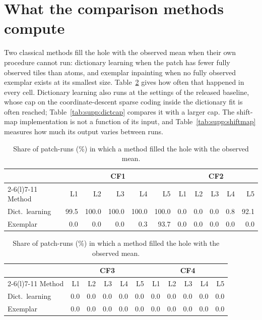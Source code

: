 \documentclass[11pt]{article}
\begin{document}
\section{What the comparison methods compute}
\label{sec:supp:baselines}

Two classical methods fill the hole with the observed mean when their own
procedure cannot run: dictionary learning when the patch has fewer fully observed
tiles than atoms, and exemplar inpainting when no fully observed exemplar exists
at its smallest size. Table~\ref{tab:supp:fallbacks} gives how often that
happened in every cell. Dictionary learning also runs at the settings of the
released baseline, whose cap on the coordinate-descent sparse coding inside the
dictionary fit is often reached; Table~\ref{tab:supp:dictcap} compares it with a
larger cap. The shift-map implementation is not a function of its input, and
Table~\ref{tab:supp:shiftmap} measures how much its output varies between runs.

\begin{table}[htbp]
\centering
\caption{Share of patch-runs (\%) in which a method filled the hole with the observed mean.}
\label{tab:supp:fallbacks}
\footnotesize
\setlength{\tabcolsep}{4pt}
\begin{tabular}{@{}l*{10}{r}@{}}
\toprule
 & \multicolumn{5}{c}{CF1} & \multicolumn{5}{c}{CF2} \\
\cmidrule(lr){2-6}\cmidrule(l){7-11}
Method & L1 & L2 & L3 & L4 & L5 & L1 & L2 & L3 & L4 & L5 \\
\midrule
Dict.\ learning & 99.5 & 100.0 & 100.0 & 100.0 & 100.0 & 0.0 & 0.0 & 0.0 & 0.8 & 92.1 \\
Exemplar & 0.0 & 0.0 & 0.0 & 0.3 & 93.7 & 0.0 & 0.0 & 0.0 & 0.0 & 0.0 \\
\bottomrule
\end{tabular}
\par\medskip
\begin{tabular}{@{}l*{10}{r}@{}}
\toprule
 & \multicolumn{5}{c}{CF3} & \multicolumn{5}{c}{CF4} \\
\cmidrule(lr){2-6}\cmidrule(l){7-11}
Method & L1 & L2 & L3 & L4 & L5 & L1 & L2 & L3 & L4 & L5 \\
\midrule
Dict.\ learning & 0.0 & 0.0 & 0.0 & 0.0 & 0.0 & 0.0 & 0.0 & 0.0 & 0.0 & 0.0 \\
Exemplar & 0.0 & 0.0 & 0.0 & 0.0 & 0.0 & 0.0 & 0.0 & 0.0 & 0.0 & 0.0 \\
\bottomrule
\end{tabular}
\end{table}
\end{document}
